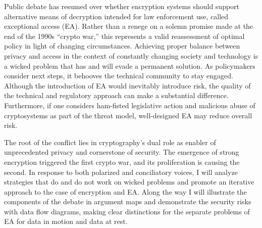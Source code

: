 
Public debate has resumed over whether encryption systems should support alternative means of decryption intended for
law enforcement use, called exceptional access (EA). Rather than a renege on a solemn promise made at the end of the
1990s ``crypto war,'' this represents a valid reassessment of optimal policy in light of changing circumstances.
Achieving proper balance between privacy and access in the context of constantly changing society and technology is a
wicked problem that has and will evade a permanent solution. As policymakers consider next steps, it behooves the
technical community to stay engaged. Although the introduction of EA would inevitably introduce risk, the quality of the
technical and regulatory approach can make a substantial difference. Furthermore, if one considers ham-fisted
legislative action and malicious abuse of cryptosystems as part of the threat model, well-designed EA may reduce overall
risk.

The root of the conflict lies in cryptography's dual role as enabler of unprecedented privacy and cornerstone of
security. The emergence of strong encryption triggered the first crypto war, and its proliferation is causing the
second. In response to both polarized and conciliatory voices, I will analyze strategies that do and do not work on
wicked problems and promote an iterative approach to the case of encryption and EA. Along the way I will illustrate the
components of the debate in argument maps and demonstrate the security risks with data flow diagrams, making clear
distinctions for the separate problems of EA for data in motion and data at rest.
